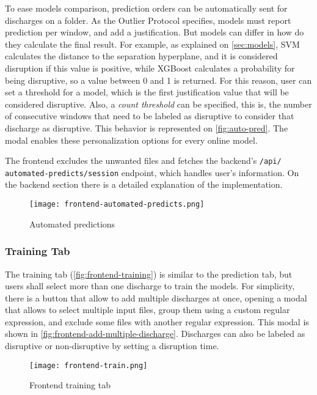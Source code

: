 To ease models comparison, prediction orders can be automatically sent for discharges on a folder. As the Outlier Protocol specifies, models must report prediction per window, and add a justification. But models can differ in how do they calculate the final result. For example, as explained on \autoref{sec:models}, SVM calculates the distance to the separation hyperplane, and it is considered disruption if this value is positive, while XGBoost calculates a probability for being disruptive, so a value between 0 and 1 is returned. For this reason, user can set a threshold for a model, which is the first justification value that will be considered disruptive. Also, a \textit{count threshold} can be specified, this is, the number of consecutive windows that need to be labeled as disruptive to consider that discharge as disruptive. This behavior is represented on \autoref{fig:auto-pred}. The modal enables these personalization options for every online model. 

The frontend excludes the unwanted files and fetches the backend's \texttt{/api/ automated-predicts/session} endpoint, which handles user's information. On the backend section there is a detailed explanation of the implementation.

\begin{figure}[H]
    \centering
    \texttt{[image: frontend-automated-predicts.png]}
    \caption{Automated predictions}
    \label{fig:auto-pred}
\end{figure}

\subsubsection{Training Tab}

The training tab (\autoref{fig:frontend-training}) is similar to the prediction tab, but users shall select more than one discharge to train the models. For simplicity, there is a button that allow to add multiple discharges at once, opening a modal that allows to select multiple input files, group them using a custom regular expression, and exclude some files with another regular expression. This modal is shown in \autoref{fig:frontend-add-multiple-discharge}. Discharges can also be labeled as disruptive or non-disruptive by setting a disruption time.

\begin{figure}[H]
    \centering
    \texttt{[image: frontend-train.png]}
    \caption{Frontend training tab}
    \label{fig:frontend-training}
\end{figure}

